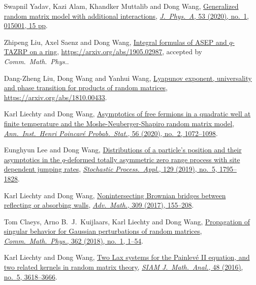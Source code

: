 \documentclass[12pt,a4paper]{article}
\begin{document}
\begin{etaremune}
\item
  Swapnil Yadav, Kazi Alam, Khandker Muttalib and Dong Wang, \href{https://arxiv.org/abs/1908.03726}{Generalized random matrix model with additional interactions}, \href{https://dx.doi.org/10.1088/1751-8121/ab56e0}{\textit{J.\ Phys.\ A}, 53 (2020), no.\ 1, 015001, 15 pp}.
\item
  Zhipeng Liu, Axel Saenz and Dong Wang, \href{https://arxiv.org/abs/1905.02987}{Integral formulas of ASEP and $q$-TAZRP on a ring}, \url{https://arxiv.org/abs/1905.02987}, accepted by \textit{Comm.\ Math.\ Phys.}.
\item
  Dang-Zheng Liu, Dong Wang and Yanhui Wang, \href{https://arxiv.org/abs/1810.00433}{Lyapunov exponent, universality and phase transition for products of random matrices}, \url{https://arxiv.org/abs/1810.00433}.
\item
  Karl Liechty and Dong Wang, \href{https://arxiv.org/abs/1706.06653}{Asymptotics of free fermions in a quadratic well at finite temperature and the Moshe-Neuberger-Shapiro random matrix model}, \href{https://doi.org/10.1214/19-AIHP994}{\textit{Ann.\ Inst.\ Henri Poincar\'{e} Probab.\ Stat.}, 56 (2020), no.\ 2, 1072--1098}.
\item
  Eunghyun Lee and Dong Wang, \href{https://arxiv.org/abs/1703.08839}{Distributions of a particle's position and their asymptotics in the $q$-deformed totally asymmetric zero range process with site dependent jumping rates}, \href{https://doi.org/10.1016/j.spa.2018.06.005}{\textit{Stochastic Process.\ Appl.}, 129 (2019), no.\ 5, 1795--1828}.
\item
  Karl Liechty and Dong Wang, \href{http://arxiv.org/abs/1608.08712}{Nonintersecting Brownian bridges between reflecting or absorbing walls}, \href{https://doi.org/10.1016/j.aim.2016.10.024}{\textit{Adv.\ Math.}, 309 (2017), 155--208}.
\item
  Tom Claeys, Arno B.~J.~Kuijlaars, Karl Liechty and Dong Wang, \href{http://arxiv.org/abs/1608.05870}{Propagation of singular behavior for Gaussian perturbations of random matrices}, \href{https://doi.org/10.1007/s00220-018-3195-8}{\textit{Comm.\ Math.\ Phys.}, 362 (2018), no.\ 1, 1--54}.
\item
  Karl Liechty and Dong Wang, \href{http://arxiv.org/abs/1601.01603}{Two Lax systems for the Painlev\'{e} II equation, and two related kernels in random matrix theory}, \href{https://doi.org/10.1137/16M1056080}{\textit{SIAM J.\ Math.\ Anal.}, 48 (2016), no.\ 5, 3618--3666}.
\item

\end{etaremune}
\end{document}
